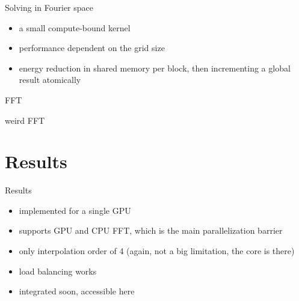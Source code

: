 \documentclass[11pt]{beamer}
\begin{document}
\begin{frame}{Solving in Fourier space}
\begin{itemize}
\item a small compute-bound kernel
\item performance dependent on the grid size
\item energy reduction in shared memory per block, then incrementing a global result atomically
\end{itemize}
\end{frame}


\begin{frame}{FFT}
\end{frame}

\begin{frame}{weird FFT}
\end{frame}

\section{Results}
\begin{frame}{Results}
\begin{itemize}
\item implemented for a single GPU
\item supports GPU and CPU FFT, which is the main parallelization barrier 
\item only interpolation order of 4 (again, not a big limitation, the core is there)
\item load balancing works
\item integrated soon, accessible here
\end{itemize}
\end{frame}
\end{document}

